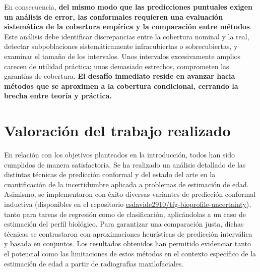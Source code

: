 En consecuencia, \textbf{del mismo modo que las predicciones puntuales exigen un análisis de error, las conformales requieren una evaluación sistemática de la cobertura empírica y la comparación entre métodos}. Este análisis debe identificar discrepancias entre la cobertura nominal y la real, detectar subpoblaciones sistemáticamente infracubiertas o sobrecubiertas, y examinar el tamaño de los intervalos. Unos intervalos excesivamente amplios carecen de utilidad práctica; unos demasiado estrechos, comprometen las garantías de cobertura. \textbf{El desafío inmediato reside en avanzar hacia métodos que se aproximen a la cobertura condicional, cerrando la brecha entre teoría y práctica.}


\section{Valoración del trabajo realizado}


En relación con los objetivos planteados en la introducción, todos han sido cumplidos de manera satisfactoria. Se ha realizado un análisis detallado de las distintas técnicas de predicción conformal y del estado del arte en la cuantificación de la incertidumbre aplicada a problemas de estimación de edad. Asimismo, se implementaron con éxito diversas variantes de predicción conformal inductiva (disponibles en el repositorio \href{https://github.com/esdavide2910/tfg-bioprofile-uncertainty}{esdavide2910/tfg-bioprofile-uncertainty}), tanto para tareas de regresión como de clasificación, aplicándolas a un caso de estimación del perfil biológico. Para garantizar una comparación justa, dichas técnicas se contrastaron con aproximaciones heurísticas de predicción interválica y basada en conjuntos. Los resultados obtenidos han permitido evidenciar tanto el potencial como las limitaciones de estos métodos en el contexto específico de la estimación de edad a partir de radiografías maxilofaciales.  


